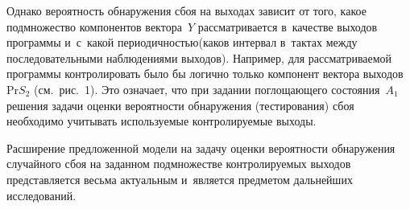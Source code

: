 \begin{multicols}{2}
{}

Однако вероятность 
обнаружения сбоя на выходах зависит от того, какое подмножество 
компонентов вектора~$Y$ рассматривается в~качестве выходов программы 
и~с~какой периодичностью\linebreak (каков интервал в~тактах между 
последовательными наблюдениями выходов). 
Например, для рассматриваемой 
программы контролировать было бы логично только компонент вектора 
выходов Pr$S_2$ (см.\ рис.~1). Это означает, что при задании поглощающего 
состояния~$A_1$ решения задачи оценки вероятности обнаружения 
(тестирования) сбоя необходимо учитывать используемые контролируемые 
выходы.
{ %

}
     
     Расширение предложенной модели на задачу оценки вероятности 
обнаружения случайного сбоя на заданном подмножестве контролируемых 
выходов представляется весьма актуальным и~является предметом дальнейших 
исследований. 

{\small\frenchspacing
 {%
 \begin{thebibliography}{99}


\end{thebibliography}}}
\end{multicols}
